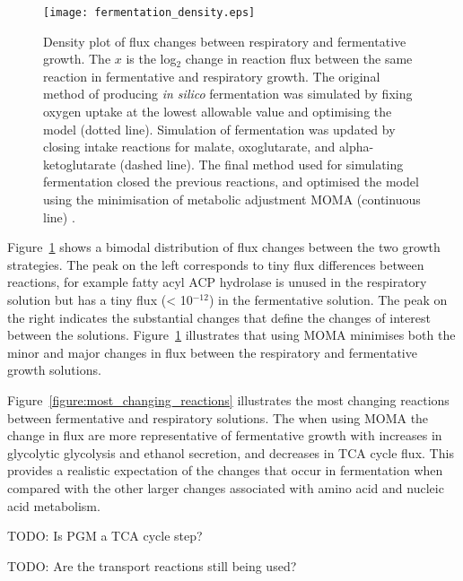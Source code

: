 \begin{figure}
  \centering
  \texttt{[image: fermentation\_density.eps]}
  \caption[Flux changes between respiratory and fermentative growth]{Density plot of flux changes between respiratory and fermentative growth. The $x$ is the log$_2$ change in reaction flux between the same reaction in fermentative and respiratory growth. The original method of producing \emph{in silico} fermentation was simulated by fixing oxygen uptake at the lowest allowable value and optimising the model (dotted line). Simulation of fermentation was updated by closing intake reactions for malate, oxoglutarate, and alpha-ketoglutarate (dashed line). The final method used for simulating fermentation closed the previous reactions, and optimised the model using the minimisation of metabolic adjustment MOMA (continuous line) \cite{segre2002}. } 
  \label{figure:fermentation_density}
\end{figure}

Figure~\ref{figure:fermentation_density} shows a bimodal distribution of flux changes between the two growth strategies. The peak on the left corresponds to tiny flux differences between reactions, for example fatty acyl ACP hydrolase is unused in the respiratory solution but has a tiny flux (< 10$^{-12}$) in the fermentative solution. The peak on the right indicates the substantial changes that define the changes of interest between the solutions. Figure~\ref{figure:fermentation_density} illustrates that using MOMA minimises both the minor and major changes in flux between the respiratory and fermentative growth solutions.

Figure~\vref{figure:most_changing_reactions} illustrates the most changing reactions between fermentative and respiratory solutions. The when using MOMA the change in flux are more representative of fermentative growth with increases in glycolytic glycolysis and ethanol secretion, and decreases in TCA cycle flux. This provides a realistic expectation of the changes that occur in fermentation when compared with the other larger changes associated with amino acid and nucleic acid metabolism.

TODO: Is PGM a TCA cycle step?

TODO: Are the transport reactions still being used?

